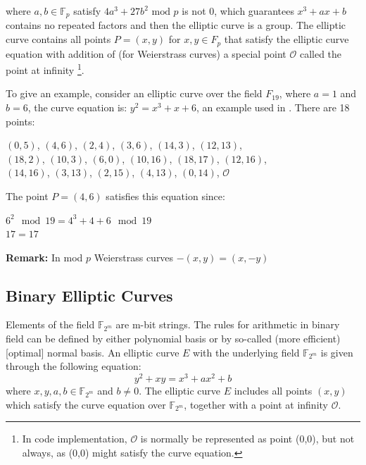 where $a,b \in \mathbb{F}_p$ satisfy $4a^3 + 27b^2 \text{ mod }p$ is not 0, which guarantees $x^3 + ax + b$ contains no repeated factors and then the elliptic curve is a group. The elliptic curve contains all points $P = (x,y)$ for $x,y \in F_p$ that satisfy the elliptic curve equation with addition of (for Weierstrass curves) a special point $\mathcal{O}$ called the point at infinity \footnote{In code implementation, $\mathcal{O}$ is normally be represented as point (0,0), but not always, as (0,0) might satisfy the curve equation.}.   
    
To give an example, consider an elliptic curve over the field $F_{19}$, where $a=1$ and $b=6$, the curve equation is: $y^2 = x^3 + x + 6$, an example used in \cite{balasubramanian1998improbability}. There are 18 points: 
\begin{center}
 $ (0,5)$, $(4,6)$, $(2,4)$, $(3,6)$, $(14,3)$, $(12,13)$, \\
$ (18,2)$, $(10,3)$, $(6,0)$, $(10,16)$, $(18,17)$, $(12,16)$, \\
$ (14,16)$, $(3,13)$, $(2,15)$, $(4,13)$, $(0,14)$, $\mathcal{O}$ 
\end{center}
The point $P=(4,6)$ satisfies this equation since:
\begin{center}
$ 6^2 \mod{19} = 4^3 + 4 + 6 \mod{19} $\\
$ 17 = 17 $ 
\end{center}
\textbf{Remark:} In mod $p$ Weierstrass curves $-(x,y) = (x,-y)$

\subsection{Binary Elliptic Curves}
Elements of the field $\mathbb{F}_{2^m}$ are m-bit strings. The rules for arithmetic in binary field can be defined by either polynomial basis or by so-called (more efficient) [optimal] normal basis\cite{IEEEP1363}. An elliptic curve $E$ with the underlying field $\mathbb{F}_{2^m}$ is given through the following equation: $$y^2+xy=x^3+ax^2+b$$ where $x,y,a,b \in \mathbb{F}_{2^m}$ and $b \neq 0$. The elliptic curve $E$ includes all points $(x,y)$ which satisfy the curve equation over $\mathbb{F}_{2^m}$, together with a point at infinity $\mathcal{O}$. 

